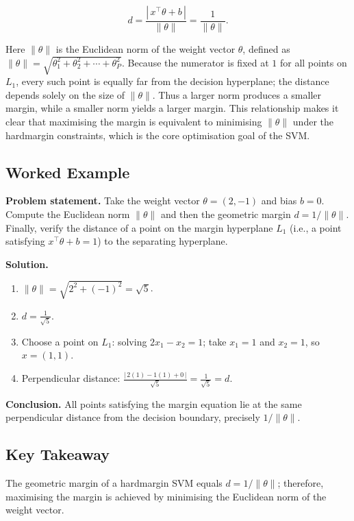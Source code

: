\documentclass[12pt, a4paper]{article}
\begin{document}
\[
d=\frac{|\,x^{\top}\theta+b\,|}{\|\theta\|}=\frac{1}{\|\theta\|}.
\]

Here \(\|\theta\|\) is the Euclidean norm of the weight vector \(\theta\), defined as \(\|\theta\|=\sqrt{\theta_{1}^{2}+\theta_{2}^{2}+ \cdots +\theta_{P}^{2}}\).  
Because the numerator is fixed at \(1\) for all points on \(L_{1}\), every such point is equally far from the decision hyperplane; the distance depends solely on the size of \(\|\theta\|\).  
Thus a larger norm produces a smaller margin, while a smaller norm yields a larger margin.  
This relationship makes it clear that maximising the margin is equivalent to minimising \(\|\theta\|\) under the hardmargin constraints, which is the core optimisation goal of the SVM.

\subsection{Worked Example}
\textbf{Problem statement.}  
Take the weight vector \(\theta=(2,-1)\) and bias \(b=0\). Compute the Euclidean norm \(\|\theta\|\) and then the geometric margin \(d=1/\|\theta\|\). Finally, verify the distance of a point on the margin hyperplane \(L_{1}\) (i.e., a point satisfying \(x^{\top}\theta+b=1\)) to the separating hyperplane.

\textbf{Solution.}

\begin{enumerate}
\item \(\displaystyle\|\theta\| = \sqrt{2^{2}+(-1)^{2}} = \sqrt{5}\).
\item \(\displaystyle d = \frac{1}{\sqrt{5}}\).
\item Choose a point on \(L_{1}\): solving \(2x_{1}-x_{2}=1\); take \(x_{1}=1\) and \(x_{2}=1\), so \(x=(1,1)\).
\item Perpendicular distance: \(\displaystyle\frac{|\,2(1)-1(1)+0\,|}{\sqrt{5}}=\frac{1}{\sqrt{5}}=d\).
\end{enumerate}

\textbf{Conclusion.} All points satisfying the margin equation lie at the same perpendicular distance from the decision boundary, precisely \(1/\|\theta\|\).

\subsection{Key Takeaway}
The geometric margin of a hardmargin SVM equals \(d = 1/\|\theta\|\); therefore, maximising the margin is achieved by minimising the Euclidean norm of the weight vector.
\end{document}
